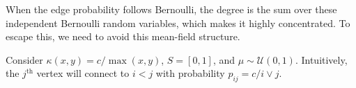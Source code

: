 \begin{remark}
	When the edge probability follows Bernoulli, the degree is the sum over these independent Bernoulli random variables, which makes it highly concentrated. To escape this, we need to avoid this mean-field structure.
\end{remark}

\begin{eg}
	Consider \(\kappa (x, y) = c / \max (x, y)\), \(S = [0, 1]\), and \(\mu \sim \mathcal{U} (0, 1)\). Intuitively, the \(j^{\text{th} }\) vertex will connect to \(i < j\) with probability \(p_{ij} = c / i \vee j\).
\end{eg}